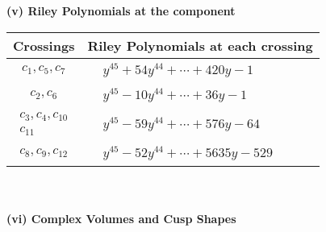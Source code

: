 \documentclass[1p]{elsarticle_modified}
\theoremstyle{definition}
\begin{document}
\newpage\renewcommand{\arraystretch}{1}
\flushleft \textbf{(v) Riley Polynomials at the component}\newline \\
\begin{tabular}{m{50pt}|m{274pt}}
Crossings & \hspace{64pt}Riley Polynomials at each crossing \\
\hline $$\begin{aligned}c_{1},c_{5},c_{7}\end{aligned}$$&$\begin{aligned}
&y^{45}+54 y^{44}+\cdots+420 y-1
\end{aligned}$\\
\hline $$\begin{aligned}c_{2},c_{6}\end{aligned}$$&$\begin{aligned}
&y^{45}-10 y^{44}+\cdots+36 y-1
\end{aligned}$\\
\hline $$\begin{aligned}c_{3},c_{4},c_{10}\\c_{11}\end{aligned}$$&$\begin{aligned}
&y^{45}-59 y^{44}+\cdots+576 y-64
\end{aligned}$\\
\hline $$\begin{aligned}c_{8},c_{9},c_{12}\end{aligned}$$&$\begin{aligned}
&y^{45}-52 y^{44}+\cdots+5635 y-529
\end{aligned}$\\
\hline
\end{tabular}\\~\\
\newpage\flushleft \textbf{(vi) Complex Volumes and Cusp Shapes}
\end{document}
